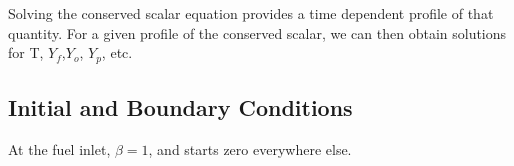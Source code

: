 \documentclass{article}
\begin{document}
Solving the conserved scalar equation provides a time dependent profile
of that quantity. For a given profile of the conserved scalar, we can
then obtain solutions for T, $Y_f$,$Y_o$, $Y_p$, etc. 

\subsection*{Initial and Boundary Conditions}

At the fuel inlet, $\beta = 1$, and starts zero everywhere else. 
\end{document}

